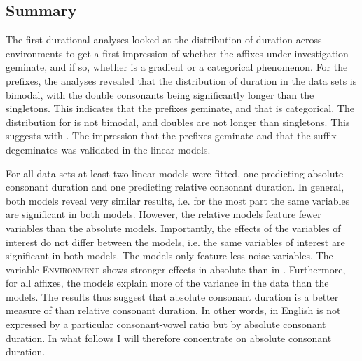 \subsection{Summary} \label{Summary Corpus Study}

The first durational analyses looked at the distribution of duration across environments to get a first impression of whether the affixes under investigation geminate, and if so, whether  is a gradient or a categorical phenomenon. 
For the prefixes, the analyses revealed that the distribution of duration in the data sets is bimodal, with the double consonants being significantly longer than the singletons. This indicates that the prefixes geminate, and that  is categorical. The distribution for  is not bimodal, and doubles are not longer than singletons. This suggests  with . The impression that the prefixes geminate and that the suffix degeminates was validated in the linear models.


For all data sets at least two linear models were fitted, one predicting absolute consonant duration and one predicting relative consonant duration. 
In general, both models reveal very similar results, i.e. for the most part the same variables are significant in both models. However, the relative models feature fewer variables than the absolute models.  Importantly, the effects of the variables of interest do not differ between the models, i.e. the same variables of interest are significant in both models. The  models only feature less noise variables. 
The variable \textsc{Environment} shows stronger effects in absolute than in . 
Furthermore, for all affixes, the  models explain more of the variance in the data than the  models. 
The results thus suggest that absolute consonant duration is a better measure of  than relative consonant duration. In other words,  in English is not expressed by a particular consonant-vowel ratio but by absolute consonant duration. 
In what follows I will therefore concentrate on absolute consonant duration.

